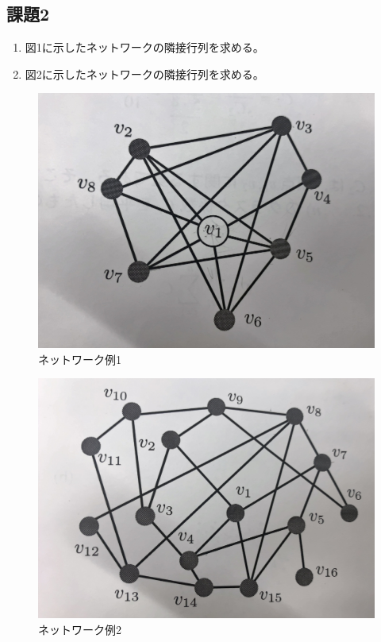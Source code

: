 \documentclass[12pt]{jarticle}
\begin{document}
\subsection{課題2}
\begin{enumerate}
    \item 図1に示したネットワークの隣接行列を求める。
    \item 図2に示したネットワークの隣接行列を求める。
\end{enumerate}
\begin{figure}[h]
    \begin{center}
        \includegraphics[scale=0.1]{kadai1_1.jpg}
    \end{center}
    \caption{ネットワーク例1}
\end{figure}

\clearpage
\begin{figure}[h]
    \begin{center}
        \includegraphics[scale=0.1]{kadai1_2.jpg}
    \end{center}
    \caption{ネットワーク例2}
\end{figure}
\end{document}
